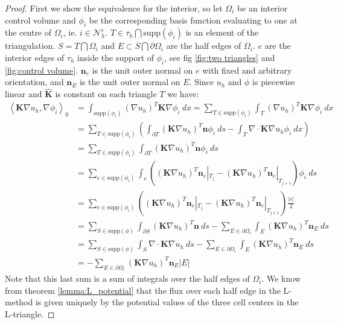 \documentclass[../Main/main.tex]{subfiles}
\begin{document}
	\begin{proof}
		First we show the equivalence for the interior, so
		let $\Omega_i$ be an interior control volume and $\phi_i$ be the corresponding basis function evaluating to one at the centre of $\Omega_i$, ie. $i \in \mathcal{N}_h^i$. $T \in \tau_h \bigcap \text{supp}(\phi_i)$ is an element of the triangulation. $S=T\bigcap \Omega_i$ and $E \subset S\bigcap \partial \Omega_i$ are the half edges of $\Omega_i$. $e$ are the interior edges of $\tau_h$ inside the support of $\phi_i$, see fig \ref{fig:two triangles} and \ref{fig:control volume}. $\pmb{n}_e$ is the unit outer normal on $e$ with fixed and arbitrary orientation, and $\pmb{n}_E$ is the unit outer normal on $E$. Since $u_h$ and $\phi$ is piecewise linear and $\pmb{\hat{K}}$ is constant on each triangle $T$ we have:
		\begin{equation}\label{eq:big computation}
			\begin{aligned}
				\left \langle \pmb{K}\nabla u_h, \nabla \phi_i \right \rangle_0 &= \int_{\text{supp}(\phi_i)} (\nabla u_h)^T \pmb{K}\nabla \phi_i \ dx = \sum_{T\in \text{supp}(\phi_i)} \int_T (\nabla u_h)^T \pmb{K}\nabla \phi_i \ dx \\
				&= \sum_{T\in \text{supp}(\phi_i)} \left ( \int_{\partial T} (\pmb{K}\nabla u_h)^T \pmb{n}\phi_i \ ds-\int_T \nabla \cdot \pmb{K} \nabla u_h \phi_i \ dx \right ) \\
				&=\sum_{T\in \text{supp}(\phi_i)}\int_{\partial T} (\pmb{K}\nabla u_h)^T \pmb{n}\phi_i \ ds \\
				&= \sum_{e\in \text{supp}(\phi_i)} \int_e ((\pmb{K}\nabla u_h)^T \pmb{n}_e|_{T_{j}} - (\pmb{K}\nabla u_h)^T \pmb{n}_e|_{T_{j+1}})\phi_i \ ds\\
				&= \sum_{e\in \text{supp}(\phi_i)}
				((\pmb{K}\nabla u_h)^T \pmb{n}_e|_{T_{j}} - (\pmb{K}\nabla u_h)^T \pmb{n}_e|_{T_{j+1}}) \frac{|e|}{2}\\
				&=\sum_{S\in \text{supp}(\phi)}\int_{\partial S}  (\pmb{K}\nabla u_h)^T \pmb{n} \ ds - \sum_{E\in \partial \Omega_i}\int_E (\pmb{K}\nabla u_h)^T \pmb{n}_E \ ds\\
				&= \sum_{S\in \text{supp}(\phi)}\int_{ S} \nabla \cdot \pmb{K}\nabla u_h \ ds - \sum_{E\in \partial \Omega_i}\int_E (\pmb{K}\nabla u_h)^T \pmb{n}_E \ ds\\
				&=- \sum_{E\in \partial \Omega_i} (\pmb{K}\nabla u_h)^T \pmb{n}_E |E| 
			\end{aligned}
		\end{equation}
		Note that this last sum is a sum of integrals over the half edges of $\Omega_i$. We know from theorem \ref{lemma:L_potential} that the flux over each half edge in the L-method is given uniquely by the potential values of the three cell centers in the L-triangle.

\end{proof}
\end{document}
